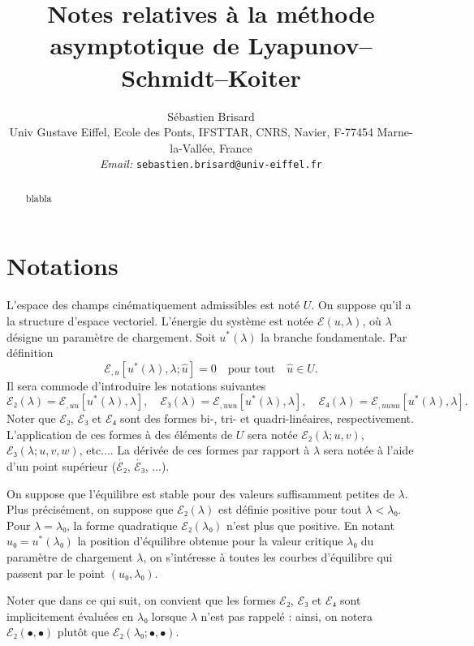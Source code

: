 \documentclass{article}
\newcommand{\tmaffiliation}[1]{\\ #1}
\newcommand{\tmemail}[1]{\\ \textit{Email:} \texttt{#1}}
\begin{document}
\title{Notes relatives à la méthode asymptotique de
Lyapunov--Schmidt--Koiter}

\author{
  Sébastien Brisard
  \tmaffiliation{Univ Gustave Eiffel, Ecole des Ponts, IFSTTAR, CNRS, Navier,
  F-77454 Marne-la-Vallée, France}
  \tmemail{sebastien.brisard@univ-eiffel.fr}
}

\maketitle

\begin{abstract}
  blabla
\end{abstract}

\section{Notations}

L'espace des champs cinématiquement admissibles est noté $U$. On
suppose qu'il a la structure d'espace vectoriel. L'énergie du système
est notée $ℰ (u, λ)$, où $λ$ désigne un
paramètre de chargement. Soit $u^{\ast} (λ)$ la branche
fondamentale. Par définition
\begin{equation}
  ℰ_{, u} [u^{\ast} (λ), λ ; \hat{u}] = 0 \quad
  \text{pour tout} \quad \hat{u}∈U.
\end{equation}
Il sera commode d'introduire les notations suivantes
\begin{equation}
  ℰ₂ (λ) =ℰ_{, u  u}  [u^{\ast} (λ),
  λ], \quad ℰ₃ (λ) =ℰ_{, u  u
   u} [u^{\ast} (λ), λ], \quad ℰ₄ (λ)
  =ℰ_{, u  u  u  u} [u^{\ast} (λ),
  λ] .
\end{equation}
Noter que $ℰ₂$, $ℰ₃$ et $ℰ₄$ sont des formes
bi-, tri- et quadri-linéaires, respectivement. L'application de ces formes
à des éléments de $U$ sera notée $ℰ₂ (λ ; u,
v)$, $ℰ₃ (λ ; u, v, w)$, etc.... La dérivée de ces
formes par rapport à $λ$ sera notée à l'aide d'un point
supérieur ($\dot{ℰ₂}$, $\dot{ℰ₃}$, ...).

On suppose que l'équilibre est stable pour des valeurs suffisamment
petites de $λ$. Plus précisément, on suppose que $ℰ₂
(λ)$ est définie positive pour tout $λ < λ₀$. Pour
$λ = λ₀$, la forme quadratique $ℰ₂ (λ₀)$ n'est
plus que positive. En notant $u₀ = u^{\ast} (λ₀)$ la position
d'équilibre obtenue pour la valeur critique $λ₀$ du paramètre
de chargement $λ$, on s'intéresse à toutes les courbes
d'équilibre qui passent par le point $(u₀, λ₀)$.

Noter que dans ce qui suit, on convient que les formes $ℰ₂$,
$ℰ₃$ et $ℰ₄$ sont implicitement évaluées en
$λ₀$ lorsque $λ$ n'est pas rappelé : ainsi, on notera
$ℰ₂ (\bullet, \bullet)$ plutôt que $ℰ₂ (λ₀ ;
\bullet, \bullet)$.
\end{document}

